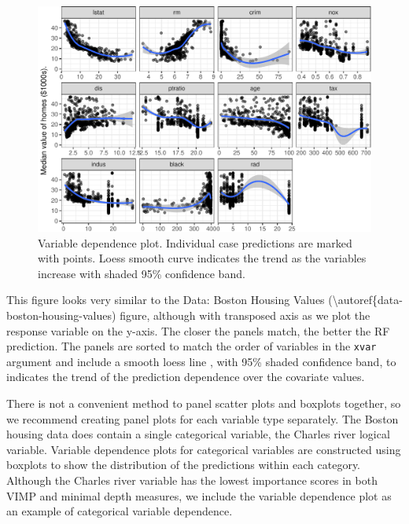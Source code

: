 \documentclass[article]{jss}
\begin{document}
\begin{CodeChunk}
\begin{figure}

{\centering \includegraphics{Regression-rfsrc_files/figure-latex/variable-1} 

}

\caption[Variable dependence plot]{Variable dependence plot. Individual case predictions are marked with points. Loess smooth curve indicates the trend as the variables increase with shaded 95\% confidence band.}\label{fig:variable}
\end{figure}
\end{CodeChunk}

This figure looks very similar to the Data: Boston Housing Values
(\textbackslash{}autoref\{data-boston-housing-values) figure, although
with transposed axis as we plot the response variable on the y-axis. The
closer the panels match, the better the RF prediction. The panels are
sorted to match the order of variables in the \texttt{xvar} argument and
include a smooth loess line
\citep[\citet{cleveland:1988}]{cleveland:1981}, with 95\% shaded
confidence band, to indicates the trend of the prediction dependence
over the covariate values.

There is not a convenient method to panel scatter plots and boxplots
together, so we recommend creating panel plots for each variable type
separately. The Boston housing data does contain a single categorical
variable, the Charles river logical variable. Variable dependence plots
for categorical variables are constructed using boxplots to show the
distribution of the predictions within each category. Although the
Charles river variable has the lowest importance scores in both VIMP and
minimal depth measures, we include the variable dependence plot as an
example of categorical variable dependence.
\end{document}
